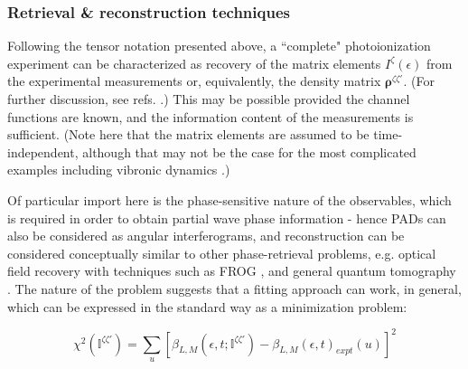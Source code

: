 \subsubsection{Retrieval \& reconstruction techniques}


Following the tensor notation presented above, a ``complete" photoionization experiment can be characterized as recovery of the matrix elements $I^{\zeta}(\epsilon)$ from the experimental measurements or, equivalently, the density matrix $\mathbf{\rho}^{\zeta\zeta'}$. (For further discussion, see refs. \cite{Reid2003,kleinpoppen2013perfect,hockett2018QMP1}.) This may be possible provided the channel functions are known, and the information content of the measurements is sufficient. (Note here that the matrix elements are assumed to be time-independent, although that may not be the case for the most complicated examples including vibronic dynamics \cite{hockett2018QMP2}.) 

Of particular import here is the phase-sensitive nature of the observables, which is required in order to obtain partial wave phase information - hence PADs can also be considered as angular interferograms, and reconstruction can be considered conceptually similar to other phase-retrieval problems, e.g. optical field recovery with techniques such as FROG \cite{trebino2000FrequencyResolvedOpticalGating}, and general quantum tomography \cite{MauroDAriano2003}. The nature of the problem suggests that a fitting approach can work, in general, which can be expressed in the standard way as a minimization problem:

\begin{equation}
\chi^{2}(\mathbb{I}^{\zeta\zeta'})=\sum_{u}\left[\beta_{L,M}(\epsilon,t;\mathbb{I}^{\zeta\zeta'})-\beta_{L,M}(\epsilon,t)_{expt}(u)\right]^{2}\label{eq:chi2-I}
\end{equation}


